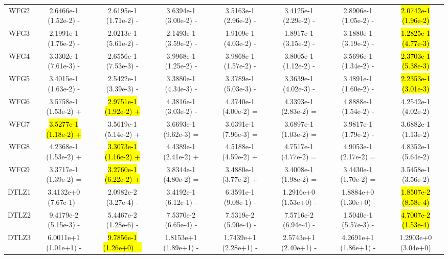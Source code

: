 \documentclass[journal]{IEEEtran}
\begin{document}
\begin{table}[tbp]
{\begin{tabular}{cccccccc}
      WFG2    & 2.6466e-1 (1.52e-2) -      & 2.6195e-1 (1.71e-2) -      & 3.6394e-1 (3.00e-2) -      & 3.5163e-1 (2.96e-2) -      & 3.4125e-1 (2.29e-2) -      & 2.8906e-1 (1.05e-2) -      & \hl{2.0742e-1 (1.96e-2)} \\
      WFG3    & 2.1991e-1 (1.76e-2) -      & 2.0213e-1 (5.61e-2) -      & 2.1493e-1 (3.59e-2) -      & 1.9109e-1 (4.03e-2) -      & 1.8917e-1 (3.15e-2) -      & 3.1880e-1 (3.19e-2) -      & \hl{1.2825e-1 (4.77e-3)} \\
      WFG4    & 3.3302e-1 (7.61e-3) -      & 2.6556e-1 (7.53e-3) -      & 3.9968e-1 (1.25e-2) -      & 3.9868e-1 (1.57e-2) -      & 3.8005e-1 (1.12e-2) -      & 3.5696e-1 (1.34e-2) -      & \hl{2.3703e-1 (5.38e-3)} \\
      WFG5    & 3.4015e-1 (1.63e-2) -      & 2.5422e-1 (3.39e-3) -      & 3.3880e-1 (4.34e-3) -      & 3.3789e-1 (5.03e-3) -      & 3.3639e-1 (4.02e-3) -      & 3.4891e-1 (1.60e-2) -      & \hl{2.2353e-1 (3.01e-3)} \\
      WFG6    & 3.5758e-1 (1.53e-2) +      & \hl{2.9751e-1 (1.92e-2) +} & 4.3816e-1 (3.03e-2) -      & 4.3740e-1 (4.00e-2) =      & 4.3393e-1 (2.83e-2) =      & 4.8888e-1 (1.54e-2) -      & 4.2542e-1 (4.02e-2)      \\
      WFG7    & \hl{3.5277e-1 (1.18e-2) +} & 3.5619e-1 (5.14e-2) +      & 3.6693e-1 (9.62e-3) =      & 3.6391e-1 (7.96e-3) =      & 3.6897e-1 (1.03e-2) =      & 3.9817e-1 (1.79e-2) -      & 3.6882e-1 (1.13e-2)      \\
      WFG8    & 4.2368e-1 (1.53e-2) +      & \hl{3.3073e-1 (1.16e-2) +} & 4.4389e-1 (2.41e-2) +      & 4.5188e-1 (4.59e-2) +      & 4.7517e-1 (4.77e-2) =      & 4.9053e-1 (2.17e-2) =      & 4.8352e-1 (5.64e-2)      \\
      WFG9    & 3.3717e-1 (1.39e-2) =      & \hl{3.2760e-1 (6.22e-2) +} & 3.8344e-1 (4.80e-2) =      & 3.4880e-1 (3.77e-2) +      & 3.4008e-1 (1.98e-2) =      & 3.4430e-1 (1.70e-2) =      & 3.5458e-1 (3.56e-2)      \\
      \hline
      DTLZ1   & 3.4132e+0 (7.67e-1) -      & 2.0982e-2 (3.27e-4) -      & 3.4192e-1 (6.12e-1) -      & 6.3591e-1 (9.08e-1) -      & 1.2916e+0 (1.53e+0) -      & 1.8884e+0 (1.30e+0) -      & \hl{1.8507e-2 (8.58e-4)} \\
      DTLZ2   & 9.4179e-2 (5.15e-3) -      & 5.4467e-2 (1.28e-6) -      & 7.5370e-2 (6.65e-4) -      & 7.5319e-2 (5.90e-4) -      & 7.5716e-2 (6.94e-4) -      & 1.5040e-1 (5.57e-3) -      & \hl{4.7007e-2 (1.53e-4)} \\
      DTLZ3   & 6.0011e+1 (1.01e+1) -      & \hl{9.7856e-1 (1.26e+0) =} & 1.8153e+1 (1.89e+1) -      & 1.7439e+1 (2.28e+1) -      & 2.5743e+1 (2.40e+1) -      & 4.2691e+1 (1.86e+1) -      & 1.2903e+0 (3.04e+0)      \\

\end{tabular}}
\end{table}
\end{document}

